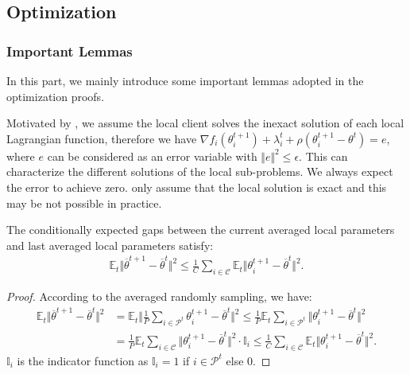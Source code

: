 \subsection{Optimization}
\subsubsection{Important Lemmas}
In this part, we mainly introduce some important lemmas adopted in the optimization proofs.

Motivated by \citet{durmus2021federated}, we assume the local client solves the inexact solution of each local Lagrangian function, therefore we have $\nabla f_i(\theta_i^{t+1}) + \lambda_i^t + \rho(\theta_i^{t+1} - \theta^t) = e$, where $e$ can be considered as an error variable with $\Vert e \Vert^2 \leq \epsilon$. This can characterize the different solutions of the local sub-problems. We always expect the error to achieve zero. \citet{durmus2021federated} only assume that the local solution is exact and this may be not possible in practice.

\begin{lemma}
    The conditionally expected gaps between the current averaged local parameters and last averaged local parameters satisfy:
    \begin{align*}
        \mathbb{E}_t\Vert \overline{\theta}^{t+1} - \overline{\theta}^{t} \Vert^2 \leq \frac{1}{C}\sum_{i\in\mathcal{C}}\mathbb{E}_t\Vert \theta_i^{t+1} - \overline{\theta}^{t} \Vert^2.
    \end{align*}
\end{lemma}
\begin{proof}
    According to the averaged randomly sampling, we have:
    \begin{align*}
        \mathbb{E}_t\Vert \overline{\theta}^{t+1} - \overline{\theta}^{t} \Vert^2 
        &= \mathbb{E}_t\Vert \frac{1}{P}\sum_{i\in\mathcal{P}^t}\theta_i^{t+1} - \overline{\theta}^{t} \Vert^2 \leq \frac{1}{P}\mathbb{E}_t\sum_{i\in\mathcal{P}^t}\Vert \theta_i^{t+1} - \overline{\theta}^{t} \Vert^2\\
        &= \frac{1}{P}\mathbb{E}_t\sum_{i\in\mathcal{C}}\Vert \theta_i^{t+1} - \overline{\theta}^{t} \Vert^2\cdot\mathbb{I}_i \leq \frac{1}{C}\sum_{i\in\mathcal{C}}\mathbb{E}_t\Vert \theta_i^{t+1} - \overline{\theta}^{t} \Vert^2.
    \end{align*}
    $\mathbb{I}_i$ is the indicator function as $\mathbb{I}_i = 1$ if $i\in\mathcal{P}^t$ else 0.
\end{proof}

